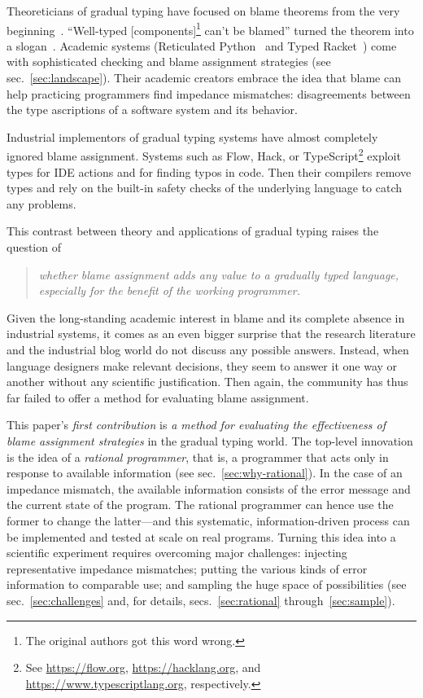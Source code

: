 
Theoreticians of gradual typing have focused on blame theorems from the
very beginning~\cite{mf-toplas-2009, tf-dls-2006}. ``Well-typed
[components]\footnote{The original authors got this word wrong.} can't be
blamed'' turned the theorem into a slogan~\cite{wf-esop-2009}. Academic
systems (Reticulated Python~\cite{vsc-dls-2019, vss-popl-2017,
vksb-dls-2014} and Typed
Racket~\cite{tf-dls-2006,tf-popl-2008,tfffgksst-snapl-2017,tf-icfp-2010})
come with sophisticated checking and blame assignment strategies (see
sec.~\ref{sec:landscape}). Their academic creators embrace the idea that
blame can help practicing programmers find impedance mismatches:
disagreements between the type ascriptions of a software system and its
behavior.

Industrial implementors of gradual typing systems have almost
completely ignored blame assignment.  Systems such as Flow, Hack, or
TypeScript\footnote{See \url{https://flow.org},
\url{https://hacklang.org}, and \url{https://www.typescriptlang.org},
respectively.} exploit types for IDE actions and for finding typos in
code. Then their compilers remove types and rely on the built-in
safety checks of the underlying language to catch any problems.

This contrast between theory and applications of gradual typing raises the question of
\begin{quote}
 \it
 whether blame assignment adds any value to a gradually typed language,
 especially for the benefit of the working programmer.
\end{quote}
Given the long-standing academic interest in blame and its complete absence in
industrial systems, it comes as an even bigger surprise that the research
literature and the industrial blog world do not discuss any possible answers.
Instead, when language designers make relevant decisions, they seem to answer it
one way or another without any scientific justification. Then again, the
community has thus far failed to offer a method for evaluating blame assignment.

This paper's {\em first contribution\/} is {\em a method for evaluating the
effectiveness of blame assignment strategies\/} in the gradual typing world.
The top-level innovation is the idea of a {\em rational programmer\/}, that is,
a programmer that acts only in response to available information (see
sec.~\ref{sec:why-rational}). In the case of an impedance mismatch, the
available information consists of the error message and the current state of the
program. The rational programmer can hence use the former to change the
latter---and this systematic, information-driven process can be implemented and
tested at scale on real programs.  Turning this idea into a scientific
experiment requires overcoming major challenges: injecting representative
impedance mismatches; putting the various kinds of error information to
comparable use; and sampling the huge space of possibilities (see
sec.~\ref{sec:challenges} and, for details, secs.~\ref{sec:rational} through~\ref{sec:sample}).

